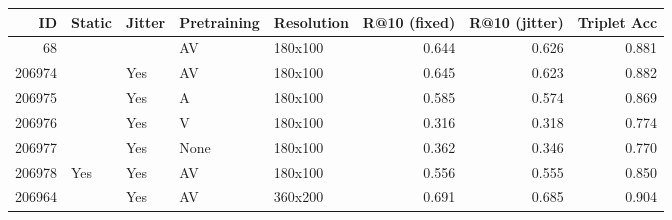 \begin{tabular}{rllllrrr}
\toprule
    ID & Static & Jitter & Pretraining & Resolution &  R@10 (fixed) &  R@10 (jitter) &  Triplet Acc \\
\midrule
    68 &        &        &          AV &    180x100 &         0.644 &          0.626 &        0.881 \\
206974 &        &    Yes &          AV &    180x100 &         0.645 &          0.623 &        0.882 \\
206975 &        &    Yes &           A &    180x100 &         0.585 &          0.574 &        0.869 \\
206976 &        &    Yes &           V &    180x100 &         0.316 &          0.318 &        0.774 \\
206977 &        &    Yes &        None &    180x100 &         0.362 &          0.346 &        0.770 \\
206978 &    Yes &    Yes &          AV &    180x100 &         0.556 &          0.555 &        0.850 \\
206964 &        &    Yes &          AV &    360x200 &         0.691 &          0.685 &        0.904 \\
\bottomrule
\end{tabular}
